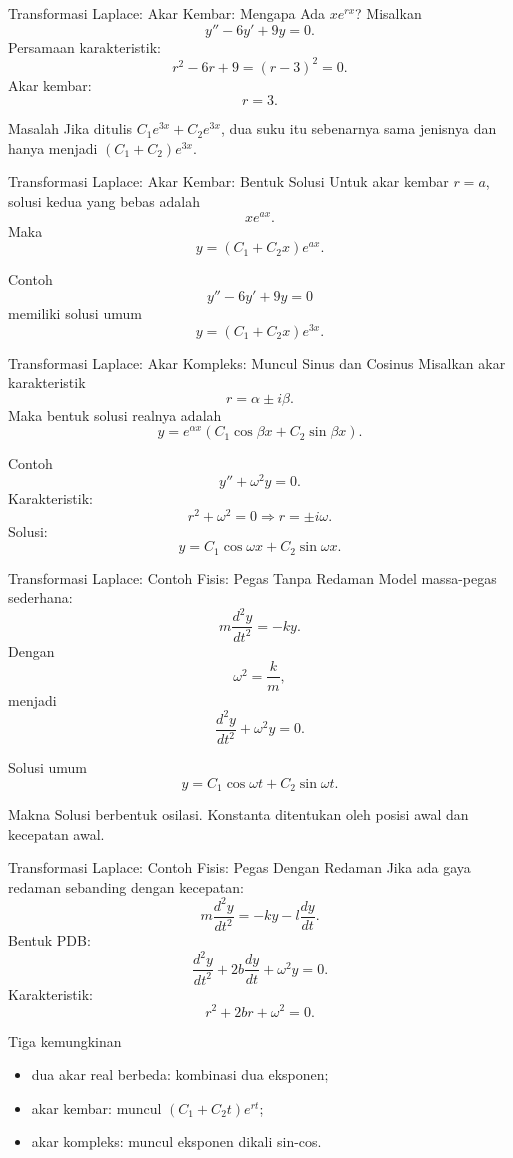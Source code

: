 \documentclass[aspectratio=169,11pt]{beamer}
\begin{document}
\begin{frame}{Transformasi Laplace: Akar Kembar: Mengapa Ada $xe^{rx}$?}
Misalkan
\[
y''-6y'+9y=0.
\]
Persamaan karakteristik:
\[
r^2-6r+9=(r-3)^2=0.
\]
Akar kembar:
\[
r=3.
\]
\begin{alertblock}{Masalah}
Jika ditulis $C_1e^{3x}+C_2e^{3x}$, dua suku itu sebenarnya sama jenisnya dan hanya menjadi $(C_1+C_2)e^{3x}$.
\end{alertblock}
\end{frame}

\begin{frame}{Transformasi Laplace: Akar Kembar: Bentuk Solusi}
Untuk akar kembar $r=a$, solusi kedua yang bebas adalah
\[
xe^{ax}.
\]
Maka
\[
\boxed{y=(C_1+C_2x)e^{ax}.}
\]
\begin{exampleblock}{Contoh}
\[
y''-6y'+9y=0
\]
memiliki solusi umum
\[
\boxed{y=(C_1+C_2x)e^{3x}.}
\]
\end{exampleblock}
\end{frame}

\begin{frame}{Transformasi Laplace: Akar Kompleks: Muncul Sinus dan Cosinus}
Misalkan akar karakteristik
\[
r=\alpha\pm i\beta.
\]
Maka bentuk solusi realnya adalah
\[
\boxed{y=e^{\alpha x}\left(C_1\cos\beta x+C_2\sin\beta x\right).}
\]
\begin{exampleblock}{Contoh}
\[
y''+\omega^2 y=0.
\]
Karakteristik:
\[
r^2+\omega^2=0\Rightarrow r=\pm i\omega.
\]
Solusi:
\[
y=C_1\cos\omega x+C_2\sin\omega x.
\]
\end{exampleblock}
\end{frame}

\begin{frame}{Transformasi Laplace: Contoh Fisis: Pegas Tanpa Redaman}
\small
Model massa-pegas sederhana:
\[
m\frac{d^2y}{dt^2}=-ky.
\]
Dengan
\[
\omega^2=\frac{k}{m},
\]
menjadi
\[
\frac{d^2y}{dt^2}+\omega^2y=0.
\]
\begin{block}{Solusi umum}
\[
y=C_1\cos\omega t+C_2\sin\omega t.
\]
\end{block}
\begin{alertblock}{Makna}
Solusi berbentuk osilasi. Konstanta ditentukan oleh posisi awal dan kecepatan awal.
\end{alertblock}
\end{frame}

\begin{frame}{Transformasi Laplace: Contoh Fisis: Pegas Dengan Redaman}
Jika ada gaya redaman sebanding dengan kecepatan:
\[
m\frac{d^2y}{dt^2}=-ky-l\frac{dy}{dt}.
\]
Bentuk PDB:
\[
\frac{d^2y}{dt^2}+2b\frac{dy}{dt}+\omega^2y=0.
\]
Karakteristik:
\[
r^2+2br+\omega^2=0.
\]
\begin{block}{Tiga kemungkinan}
\begin{itemize}
  \item dua akar real berbeda: kombinasi dua eksponen;
  \item akar kembar: muncul $(C_1+C_2t)e^{rt}$;
  \item akar kompleks: muncul eksponen dikali sin-cos.
\end{itemize}
\end{block}
\end{frame}
\end{document}
